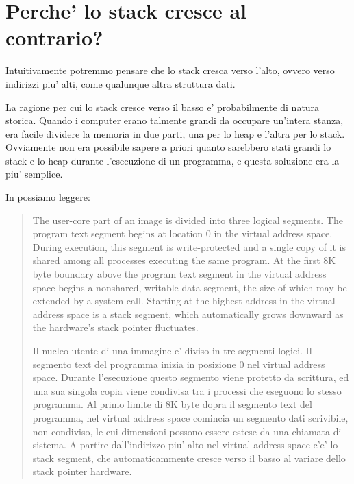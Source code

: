 \section{Perche' lo stack cresce al contrario?}

Intuitivamente potremmo pensare che lo stack cresca verso l'alto, ovvero verso indirizzi piu' alti, come qualunque altra struttura dati.

La ragione per cui lo stack cresce verso il basso e' probabilmente di natura storica.
Quando i computer erano talmente grandi da occupare un'intera stanza, era facile dividere la memoria in due parti, una per lo 
\gls{heap} e l'altra per lo stack.
Ovviamente non era possibile sapere a priori quanto sarebbero stati grandi lo stack e lo \gls{heap} durante l'esecuzione di un programma,
e questa soluzione era la piu' semplice.



In \cite{Ritchie74} possiamo leggere:

\begin{framed}
\begin{quotation}
The user-core part of an image is divided into three logical segments.
The program text segment begins at location 0 in the virtual address space.
During execution, this segment is write-protected and a single copy of it is shared among all processes executing the same program.
At the first 8K byte boundary above the program text segment in the virtual address space begins a nonshared, writable data segment, the size of which may be extended by a system call.
Starting at the highest address in the virtual address space is a stack segment, which automatically grows downward as the hardware's stack pointer fluctuates.

Il nucleo utente di una immagine e' diviso in tre segmenti logici.
Il segmento text del programma inizia in posizione 0 nel virtual address space.
Durante l'esecuzione questo segmento viene protetto da scrittura, ed una sua singola copia viene condivisa tra i processi che eseguono lo stesso programma.
Al primo limite di 8K byte dopra il segmento text del programma, nel virtual address space comincia un segmento dati scrivibile, non condiviso, le cui dimensioni possono essere estese da una chiamata di sistema.
A partire dall'indirizzo piu' alto nel virtual address space c'e' lo stack segment, che automaticammente cresce verso il basso al variare dello stack pointer hardware.
\end{quotation}
\end{framed}

